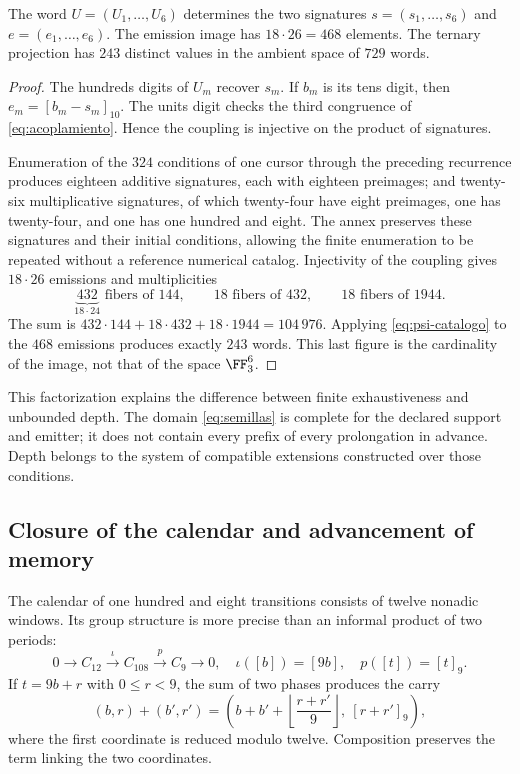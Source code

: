 \begin{proposition}
The word \(U=(U_1,\ldots,U_6)\) determines the two signatures \(s=(s_1,\ldots,s_6)\) and \(e=(e_1,\ldots,e_6)\). The emission image has \(18\cdot26=468\) elements. The ternary projection has \(243\) distinct values in the ambient space of \(729\) words.
\end{proposition}
\begin{proof}
The hundreds digits of \(U_m\) recover \(s_m\). If \(b_m\) is its tens digit, then \(e_m=[b_m-s_m]_{10}\). The units digit checks the third congruence of \eqref{eq:acoplamiento}. Hence the coupling is injective on the product of signatures.

Enumeration of the \(324\) conditions of one cursor through the preceding recurrence produces eighteen additive signatures, each with eighteen preimages; and twenty-six multiplicative signatures, of which twenty-four have eight preimages, one has twenty-four, and one has one hundred and eight. The annex preserves these signatures and their initial conditions, allowing the finite enumeration to be repeated without a reference numerical catalog. Injectivity of the coupling gives \(18\cdot26\) emissions and multiplicities
\[
 \underbrace{432}_{18\cdot24}\text{ fibers of }144,
 \qquad18\text{ fibers of }432,
 \qquad18\text{ fibers of }1944.
\]
The sum is \(432\cdot144+18\cdot432+18\cdot1944=104\,976\). Applying \eqref{eq:psi-catalogo} to the \(468\) emissions produces exactly \(243\) words. This last figure is the cardinality of the image, not that of the space \(\FF_3^6\).
\end{proof}

This factorization explains the difference between finite exhaustiveness and unbounded depth. The domain \eqref{eq:semillas} is complete for the declared support and emitter; it does not contain every prefix of every prolongation in advance. Depth belongs to the system of compatible extensions constructed over those conditions.

\subsection{Closure of the calendar and advancement of memory}

The calendar of one hundred and eight transitions consists of twelve nonadic windows. Its group structure is more precise than an informal product of two periods:
\begin{equation}
 0\longrightarrow C_{12}\xrightarrow{\iota}C_{108}
 \xrightarrow{p}C_9\longrightarrow0,
 \quad\iota([b])=[9b],\quad p([t])=[t]_9.
 \label{eq:extension108}
\end{equation}
If \(t=9b+r\) with \(0\le r<9\), the sum of two phases produces the carry
\[
 (b,r)+(b',r')=
 \left(b+b'+\left\lfloor\frac{r+r'}9\right\rfloor,\ [r+r']_9\right),
\]
where the first coordinate is reduced modulo twelve. Composition preserves the term linking the two coordinates.

